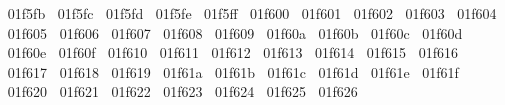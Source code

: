 {  ^^^^^^01f5fb%
  ^^^^^^01f5fc%
  ^^^^^^01f5fd%
  ^^^^^^01f5fe%
  ^^^^^^01f5ff%
  ^^^^^^01f600%
  ^^^^^^01f601%
  ^^^^^^01f602%
  ^^^^^^01f603%
  ^^^^^^01f604%
  ^^^^^^01f605%
  ^^^^^^01f606%
  ^^^^^^01f607%
  ^^^^^^01f608%
  ^^^^^^01f609%
  ^^^^^^01f60a%
  ^^^^^^01f60b%
  ^^^^^^01f60c%
  ^^^^^^01f60d%
  ^^^^^^01f60e%
  ^^^^^^01f60f%
  ^^^^^^01f610%
  ^^^^^^01f611%
  ^^^^^^01f612%
  ^^^^^^01f613%
  ^^^^^^01f614%
  ^^^^^^01f615%
  ^^^^^^01f616%
  ^^^^^^01f617%
  ^^^^^^01f618%
  ^^^^^^01f619%
  ^^^^^^01f61a%
  ^^^^^^01f61b%
  ^^^^^^01f61c%
  ^^^^^^01f61d%
  ^^^^^^01f61e%
  ^^^^^^01f61f%
  ^^^^^^01f620%
  ^^^^^^01f621%
  ^^^^^^01f622%
  ^^^^^^01f623%
  ^^^^^^01f624%
  ^^^^^^01f625%
  ^^^^^^01f626%
}
